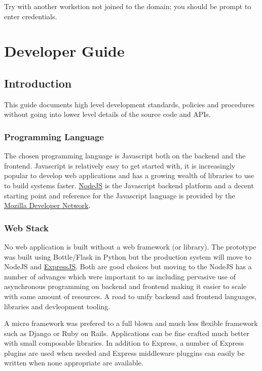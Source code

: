 \documentclass[letterpaper,10pt,english]{sphinxmanual}
\begin{document}
Try with another workstion not joined to the domain; you should be
prompt to enter credentials.


\chapter{Developer Guide}
\label{developer-guide::doc}\label{developer-guide:developer-guide}

\section{Introduction}
\label{developer-guide:introduction}\label{developer-guide:intro}
This guide documents high level development standards, policies and
procedures without going into lower level details of the source code
and APIs.


\subsection{Programming Language}
\label{developer-guide:programming-language}
The chosen programming language is Javascript both on the backend and
the frontend. Javascript is relatively easy to get started with, it is
increasingly popular to develop web applications and has a growing
wealth of libraries to use to build systems faster. \href{http://www.nodejs.org/}{NodeJS} is the Javascript backend platform and a
decent starting point and reference for the Javascript language is
provided by the \href{https://developer.mozilla.org/en-US/docs/Web/JavaScript}{Mozilla Developer Network}.


\subsection{Web Stack}
\label{developer-guide:web-stack}
No web application is built without a web framework (or library). The
prototype was built using Bottle/Flask in Python but the production
system will move to NodeJS and \href{http://expressjs.com/}{ExpressJS}. Both are good choices but moving to the
NodeJS has a number of advanges which were important to us including
pervasive use of asynchronous programming on backend and frontend
making it easier to scale with same amount of resources. A road to
unify backend and frontend languages, libraries and devleopment
tooling.

A micro framework was prefered to a full blown and much less flexible
framework such as Django or Ruby on Rails. Applications can be fine
crafted much better with small composable libraries. In addition to
Express, a number of Express plugins are used when needed and
Express middleware pluggins can easily be written when none
appropriate are available.
\end{document}
